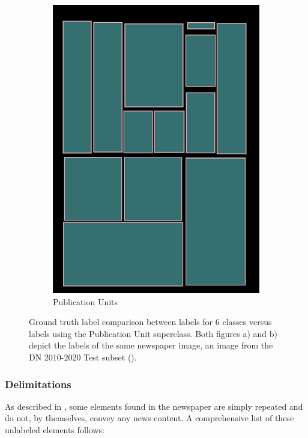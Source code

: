 \documentclass[oneside, english, bibtex]{kththesis}
\begin{document}
\begin{figure}[H]
\begin{adjustbox}{center}
{\begin{subfigure}{0.5\textwidth}
  \includegraphics[width=\linewidth, clip=true, trim = 0mm 0mm 0mm 0mm]{figures/1c_bbox/kvtooQ3.jpg}
  \caption{Publication Units}
  \label{fig:kvtooQ3_1c}
\end{subfigure}}
\end{adjustbox}
  \caption{Ground truth label comparison between labels for 6 classes versus labels using the Publication Unit superclass. Both figures a) and b) depict the labels of the same newspaper image, an image from the DN 2010-2020 Test subset (). }
\label{fig:pubunit}
\end{figure}


\subsubsection{Delimitations}

As described in , some elements found in the newspaper are simply repeated and do not, by themselves, convey any news content.
A comprehensive list of these unlabeled elements follows:
\end{document}
